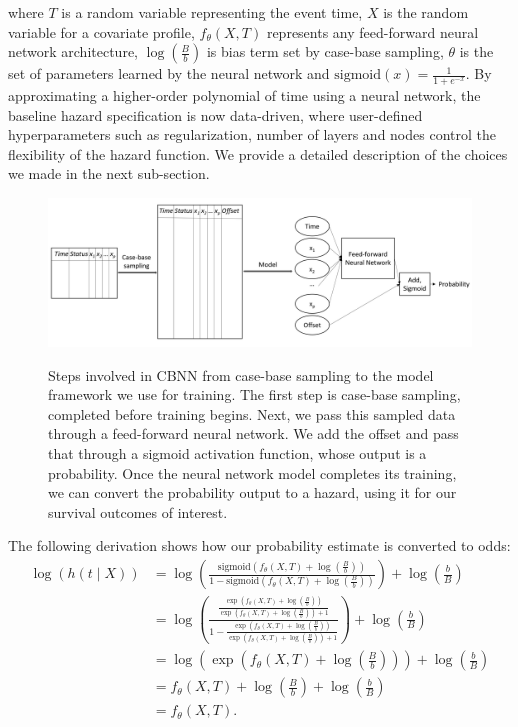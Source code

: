 \documentclass[APA,LATO1COL]{WileyNJD-v2}
\begin{document}
where \(T\) is a random variable representing the event time, \(X\) is
the random variable for a covariate profile, \(f_{\theta}(X, T)\)
represents any feed-forward neural network architecture,
\(\log\left(\frac{B}{b}\right)\) is bias term set by case-base sampling,
\(\theta\) is the set of parameters learned by the neural network and
\(\mathrm{sigmoid}(x)=\frac{1}{1+e^{-x}}\). By approximating a
higher-order polynomial of time using a neural network, the baseline
hazard specification is now data-driven, where user-defined
hyperparameters such as regularization, number of layers and nodes
control the flexibility of the hazard function. We provide a detailed
description of the choices we made in the next sub-section.

\begin{figure}

{\centering \includegraphics[width=1\linewidth]{../../../figures/nnarch2}}

\caption{Steps involved in CBNN from case-base sampling to the model framework we use for training. The first step is case-base sampling, completed before training begins. Next, we pass this sampled data through a feed-forward neural network. We add the offset and pass that through a sigmoid activation function, whose output is a probability. Once the neural network model completes its training, we can convert the probability output to a hazard, using it for our survival outcomes of interest.}\label{fig:NNarch}
\end{figure}

The following derivation shows how our probability estimate is converted
to odds: \begin{align*}
 \log\left( h(t \mid X) \right) &= \log\left(\frac{\mathrm{sigmoid}\left(f_{\theta}(X, T) + \log\left(\frac{B}{b}\right)\right)}{1-\mathrm{sigmoid}\left(f_{\theta}(X, T) + \log\left(\frac{B}{b}\right)\right)}\right) + \log\left(\frac{b}{B}\right) \\
 &= \log\left( \frac{\frac{\exp\left(f_{\theta}(X, T) + \log\left(\frac{B}{b}\right)\right)}{\exp\left(f_{\theta}(X, T) + \log\left(\frac{B}{b}\right)\right)+1}}{1-\frac{\exp\left(f_{\theta}(X, T) + \log\left(\frac{B}{b}\right)\right)}{\exp\left(f_{\theta}(X, T) + \log\left(\frac{B}{b}\right)\right)+1}}\right) + \log\left(\frac{b}{B}\right) \\
 &= \log\left(\exp\left( f_{\theta}(X, T) + \log\left(\frac{B}{b}\right) \right) \right) + \log\left(\frac{b}{B}\right) \\
 &= f_{\theta}(X, T) + \log\left(\frac{B}{b}\right) + \log\left(\frac{b}{B}\right) \\
&= f_{\theta}(X, T). 
\end{align*}
\end{document}
